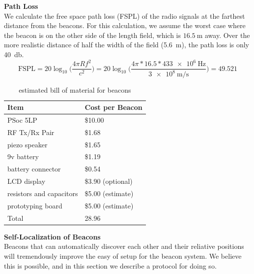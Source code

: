 \documentclass{article}
\begin{document}
      \textbf{Path Loss} \\
      We calculate the free space path loss (FSPL) of the radio signals at the farthest distance from the beacons. For this calculation, we assume the worst case where the beacon is on the other side of the length field, which is $\SI{16.5}{\meter}$ away. Over the more realistic distance of half the width of the field (\SI{5.6}{\meter}), the path loss is only \SI{40}{\decibel}. \\
      $$ \text{FSPL} = 20\log_{10}\Bigg(\frac{4\pi Rf^2}{c^2}\Bigg) = 20\log_{10}\Bigg(\frac{4\pi*16.5*\SI{433e6}{\hertz}}{\SI{3e8}{\meter\per\second}}\Bigg) = 49.521 $$

      \begin{table}
        \label{table:beacon_bom}
        \begin{tabular}{|l|l|}
          \hline
          Item & Cost per Beacon \\
          \hline
          PSoc 5LP & \$10.00 \\
          RF Tx/Rx Pair & \$1.68 \\
          piezo speaker & \$1.65 \\
          9v battery & \$1.19 \\
          battery connector & \$0.54 \\
          LCD display & \$3.90 (optional) \\
          resistors and capacitors & \$5.00 (estimate) \\
          prototyping board & \$5.00 (estimate) \\
          \hline
          Total & 28.96 \\
          \hline
        \end{tabular}
        \caption{estimated bill of material for beacons}
      \end{table}

      \textbf{Self-Localization of Beacons} \\
      Beacons that can automatically discover each other and their reliative positions will tremendously improve the easy of setup for the beacon system. We believe this is possible, and in this section we describe a protocol for doing so.
\end{document}
